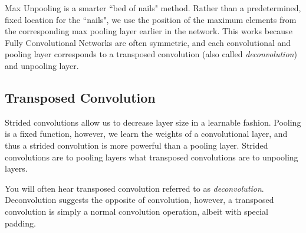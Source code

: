 \documentclass{article}
\begin{document}
Max Unpooling is a smarter ``bed of nails" method. Rather than a predetermined, fixed location for the ``nails", we use the position of the maximum elements from the corresponding max pooling layer earlier in the network. This works because Fully Convolutional Networks are often symmetric, and each convolutional and pooling layer corresponds to a transposed convolution (also called \textit{deconvolution}) and unpooling layer.


\subsection{Transposed Convolution}
Strided convolutions allow us to decrease layer size in a learnable fashion. Pooling is a fixed function, however, we learn the weights of a convolutional layer, and thus a strided convolution is more powerful than a pooling layer. Strided convolutions are to pooling layers what transposed convolutions are to unpooling layers.

You will often hear transposed convolution referred to as \textit{deconvolution}. Deconvolution suggests the opposite of convolution, however, a transposed convolution is simply a normal convolution operation, albeit with special padding.
\end{document}
